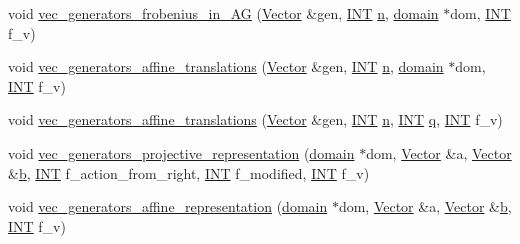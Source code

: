 \begin{DoxyCompactItemize}
\item 
void \mbox{\hyperlink{perm__group__gens_8_c_aa7e25c62e5735b9785e9dfa02413cbab}{vec\+\_\+generators\+\_\+frobenius\+\_\+in\+\_\+\+AG}} (\mbox{\hyperlink{class_vector}{Vector}} \&gen, \mbox{\hyperlink{galois_8h_a09fddde158a3a20bd2dcadb609de11dc}{I\+NT}} \mbox{\hyperlink{simeon_8_c_a7f2cd26777ce0ff3fdaf8d02aacbddfb}{n}}, \mbox{\hyperlink{classdomain}{domain}} $\ast$dom, \mbox{\hyperlink{galois_8h_a09fddde158a3a20bd2dcadb609de11dc}{I\+NT}} f\+\_\+v)
\item 
void \mbox{\hyperlink{perm__group__gens_8_c_a7823a00ce1bf9cd69d1f9543e594e0e6}{vec\+\_\+generators\+\_\+affine\+\_\+translations}} (\mbox{\hyperlink{class_vector}{Vector}} \&gen, \mbox{\hyperlink{galois_8h_a09fddde158a3a20bd2dcadb609de11dc}{I\+NT}} \mbox{\hyperlink{simeon_8_c_a7f2cd26777ce0ff3fdaf8d02aacbddfb}{n}}, \mbox{\hyperlink{classdomain}{domain}} $\ast$dom, \mbox{\hyperlink{galois_8h_a09fddde158a3a20bd2dcadb609de11dc}{I\+NT}} f\+\_\+v)
\item 
void \mbox{\hyperlink{perm__group__gens_8_c_ac4f5e1074cf38552f67cd4ed6deba6ea}{vec\+\_\+generators\+\_\+affine\+\_\+translations}} (\mbox{\hyperlink{class_vector}{Vector}} \&gen, \mbox{\hyperlink{galois_8h_a09fddde158a3a20bd2dcadb609de11dc}{I\+NT}} \mbox{\hyperlink{simeon_8_c_a7f2cd26777ce0ff3fdaf8d02aacbddfb}{n}}, \mbox{\hyperlink{galois_8h_a09fddde158a3a20bd2dcadb609de11dc}{I\+NT}} \mbox{\hyperlink{simeon_8_c_a92cbb483a3b27ae1a0dbfcb125ce216f}{q}}, \mbox{\hyperlink{galois_8h_a09fddde158a3a20bd2dcadb609de11dc}{I\+NT}} f\+\_\+v)
\item 
void \mbox{\hyperlink{perm__group__gens_8_c_a265645d026830ea3330152d82df495ce}{vec\+\_\+generators\+\_\+projective\+\_\+representation}} (\mbox{\hyperlink{classdomain}{domain}} $\ast$dom, \mbox{\hyperlink{class_vector}{Vector}} \&a, \mbox{\hyperlink{class_vector}{Vector}} \&\mbox{\hyperlink{alphabet2_8_c_a148e3876077787926724625411d6e7a9}{b}}, \mbox{\hyperlink{galois_8h_a09fddde158a3a20bd2dcadb609de11dc}{I\+NT}} f\+\_\+action\+\_\+from\+\_\+right, \mbox{\hyperlink{galois_8h_a09fddde158a3a20bd2dcadb609de11dc}{I\+NT}} f\+\_\+modified, \mbox{\hyperlink{galois_8h_a09fddde158a3a20bd2dcadb609de11dc}{I\+NT}} f\+\_\+v)
\item 
void \mbox{\hyperlink{perm__group__gens_8_c_a27181dfd3b9ac8fa1675843fa3a8fdf0}{vec\+\_\+generators\+\_\+affine\+\_\+representation}} (\mbox{\hyperlink{classdomain}{domain}} $\ast$dom, \mbox{\hyperlink{class_vector}{Vector}} \&a, \mbox{\hyperlink{class_vector}{Vector}} \&\mbox{\hyperlink{alphabet2_8_c_a148e3876077787926724625411d6e7a9}{b}}, \mbox{\hyperlink{galois_8h_a09fddde158a3a20bd2dcadb609de11dc}{I\+NT}} f\+\_\+v)

\end{DoxyCompactItemize}
